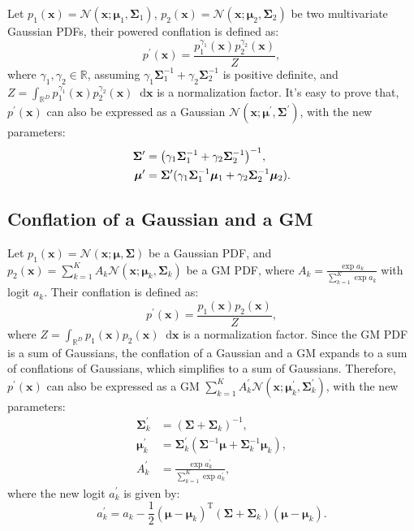 \documentclass{article}
\def\vmu{{\bm{\mu}}}
\def\vx{{\bm{x}}}
\def\mSigma{{\bm{\Sigma}}}
\newcommand{\R}{\mathbb{R}}
\theoremstyle{custom}
\theoremstyle{definition}
\theoremstyle{remark}
\let\originalleft\left
\let\originalright\right
\renewcommand{\left}{\mathopen{}\mathclose\bgroup\originalleft}
\renewcommand{\right}{\aftergroup\egroup\originalright}
\newcommand{\diff}{\mathop{}\!\mathrm{d}}
\begin{document}
Let $p_1(\vx) = \mathcal{N}(\vx; \vmu_1, \mSigma_1)$, $p_2(\vx) = \mathcal{N}(\vx; \vmu_2, \mSigma_2)$ be two multivariate Gaussian PDFs, their powered conflation is defined as:
\begin{equation}
    p^\prime(\vx) = \frac{p_1^{\gamma_1}(\vx) p_2^{\gamma_2}(\vx)}{Z},
\end{equation}
where $\gamma_1, \gamma_2 \in \R$, assuming $\gamma_1 \mSigma_1^{-1} + \gamma_2 \mSigma_2^{-1}$ is positive definite, and $Z = \int_{\R^D} p_1^{\gamma_1}(\vx) p_2^{\gamma_2}(\vx) \diff \vx $ is a normalization factor. It's easy to prove that,  $p^\prime(\vx)$ can also be expressed as a Gaussian $\mathcal{N}(\vx; \vmu^\prime, \mSigma^\prime)$, with the new parameters:
\begin{align}
    \mSigma^\prime &= \left(\gamma_1 \mSigma_1^{-1} + \gamma_2 \mSigma_2^{-1}\right)^{-1}, \\
    \vmu^\prime &= \mSigma^\prime (\gamma_1 \mSigma_1^{-1} \vmu_1 + \gamma_2 \mSigma_2^{-1} \vmu_2).
\end{align}

\subsection{Conflation of a Gaussian and a GM}
\label{sec:conflationgm}
Let $p_1(\vx) = \mathcal{N}(\vx; \vmu, \mSigma)$ be a Gaussian PDF, and $p_2(\vx) = \sum_{k=1}^{K} A_k \mathcal{N}(\vx; \vmu_k, \mSigma_k)$ be a GM PDF, where $A_k = \frac{\exp a_k}{\sum_{k=1}^K \exp a_k}$ with logit $a_k$. Their conflation is defined as:
\begin{equation}
    p^\prime(\vx) = \frac{p_1(\vx) p_2(\vx)}{Z},
\end{equation}
where $Z = \int_{\R^D} p_1(\vx) p_2(\vx) \diff \vx $ is a normalization factor. Since the GM PDF is a sum of Gaussians, the conflation of a Gaussian and a GM expands to a sum of conflations of Gaussians, which simplifies to a sum of Gaussians. Therefore, $p^\prime(\vx)$ can also be expressed as a GM $\sum_{k=1}^{K} A_k^\prime \mathcal{N}(\vx; \vmu^\prime_k, \mSigma^\prime_k)$, with the new parameters:
\begin{align}
    \mSigma^\prime_k &= (\mSigma + \mSigma_k)^{-1}, \\
    \vmu^\prime_k &= \mSigma^\prime_k (\mSigma^{-1} \vmu + \mSigma_k^{-1} \vmu_k), \\
    A^\prime_k &= \frac{\exp a^\prime_k}{\sum_{k=1}^K \exp a^\prime_k},
\end{align}
where the new logit $a^\prime_k$ is given by:
\begin{equation}
    a^\prime_k = a_k - \frac{1}{2} (\vmu - \vmu_k)^\text{T} (\mSigma + \mSigma_k) (\vmu - \vmu_k).
\end{equation}
\end{document}
